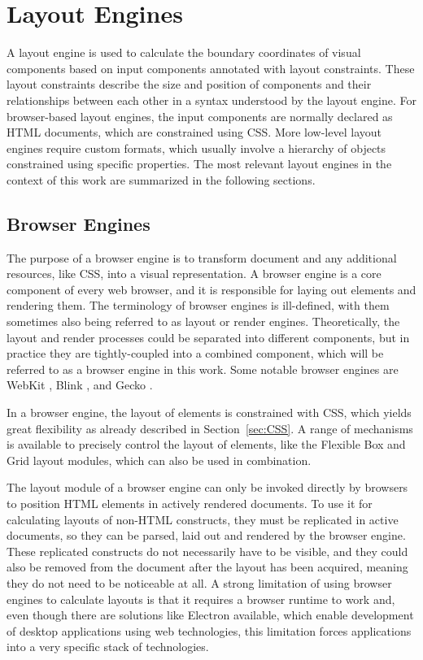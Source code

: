 \section{Layout Engines}
\label{sec:LayoutEngines}

A layout engine is used to calculate the boundary coordinates of
visual components based on input components annotated with layout
constraints. These layout constraints describe the size and position
of components and their relationships between each other in a syntax
understood by the layout engine. For browser-based layout engines, the
input components are normally declared as HTML documents, which are
constrained using CSS. More low-level layout engines require custom
formats, which usually involve a hierarchy of objects constrained
using specific properties. The most relevant layout engines in the
context of this work are summarized in the following sections.


\subsection{Browser Engines}
\label{sec:BrowserEngines}

The purpose of a browser engine is to transform document and any
additional resources, like CSS, into a visual representation. A
browser engine is a core component of every web browser, and it is
responsible for laying out elements and rendering them.  The
terminology of browser engines is ill-defined, with them sometimes
also being referred to as layout or render engines. Theoretically, the
layout and render processes could be separated into different
components, but in practice they are tightly-coupled into a combined
component, which will be referred to as a browser engine in this work.
Some notable browser engines are WebKit \parencite{WebKit}, Blink
\parencite{Blink}, and Gecko \parencite{Gecko}.

In a browser engine, the layout of elements is constrained with CSS,
which yields great flexibility as already described in
Section~\ref{sec:CSS}. A range of mechanisms is available to precisely
control the layout of elements, like the Flexible Box and Grid layout
modules, which can also be used in combination.

The layout module of a browser engine can only be invoked directly by
browsers to position HTML elements in actively rendered documents. To
use it for calculating layouts of non-HTML constructs, they must be
replicated in active documents, so they can be parsed, laid out and
rendered by the browser engine. These replicated constructs do not
necessarily have to be visible, and they could also be removed from
the document after the layout has been acquired, meaning they do not
need to be noticeable at all. A strong limitation of using browser
engines to calculate layouts is that it requires a browser runtime to
work and, even though there are solutions like Electron
\parencite{Electron} available, which enable development of desktop
applications using web technologies, this limitation forces
applications into a very specific stack of technologies.



